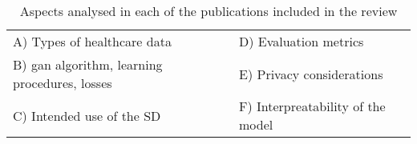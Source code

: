 \begin{table}[htb]
\centering
  \caption{Aspects analysed in each of the publications included in the review\label{tab:themes}}
  \begin{tabular}{ll}\toprule
  A) Types of healthcare data & D) Evaluation metrics\\
  B) \gls{gan} algorithm, learning procedures, losses & E) Privacy considerations\\
  C) Intended use of the SD & F) Interpreatability of the model\\\bottomrule
  \end{tabular}
\end{table}